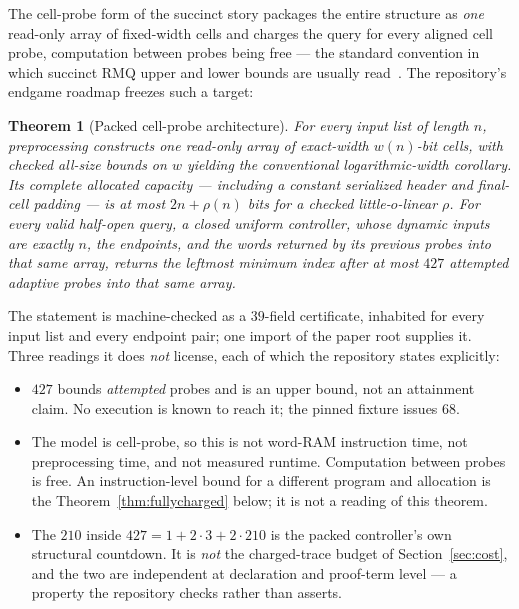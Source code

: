 \documentclass[11pt]{article}
\newcommand{\ledger}[1]{}
\newtheorem{theorem}{Theorem}[section]
\theoremstyle{definition}
\theoremstyle{remark}
\begin{document}
The cell-probe form of the succinct story packages the entire structure as
\emph{one} read-only array of fixed-width cells and charges the query for
every aligned cell probe, computation between probes being free --- the
standard convention in which succinct RMQ upper and lower bounds are
usually read~\cite{GalMiltersen07,LiuYu20}. The repository's endgame roadmap
freezes such a target:

\begin{theorem}[Packed cell-probe architecture]
\label{thm:packed}
For every input list of length $n$, preprocessing constructs one read-only
array of exact-width $w(n)$-bit cells, with checked all-size bounds on $w$
yielding the conventional logarithmic-width corollary. Its complete
allocated capacity --- including a constant serialized header and final-cell
padding --- is at most $2n + \rho(n)$ bits for a checked little-$o$-linear
$\rho$. For every valid half-open query, a closed uniform controller, whose
dynamic inputs are exactly $n$, the endpoints, and the words returned by
its previous probes into that same array, returns the leftmost minimum
index after at most $427$ \emph{attempted} adaptive probes into that same
array.\ledger{L-ARCH-01}
\end{theorem}

\noindent The statement is machine-checked as a $39$-field certificate,
inhabited for every input list and every endpoint pair; one import of the
paper root supplies it. Three readings it does \emph{not} license, each of
which the repository states explicitly:

\begin{itemize}
\item $427$ bounds \emph{attempted} probes and is an upper bound, not an
      attainment claim. No execution is known to reach it; the pinned
      fixture issues $68$.
\item The model is cell-probe, so this is not word-RAM instruction time, not
      preprocessing time, and not measured runtime. Computation between
      probes is free. An instruction-level bound for a different program and
      allocation is the Theorem~\ref{thm:fullycharged} below; it
      is not a reading of this theorem.
\item The $210$ inside $427 = 1 + 2\cdot 3 + 2\cdot 210$ is the packed
      controller's own structural countdown. It is \emph{not} the
      charged-trace budget of Section~\ref{sec:cost}, and the two are
      independent at declaration and proof-term level --- a property the
      repository checks rather than asserts.
\end{itemize}
\end{document}
